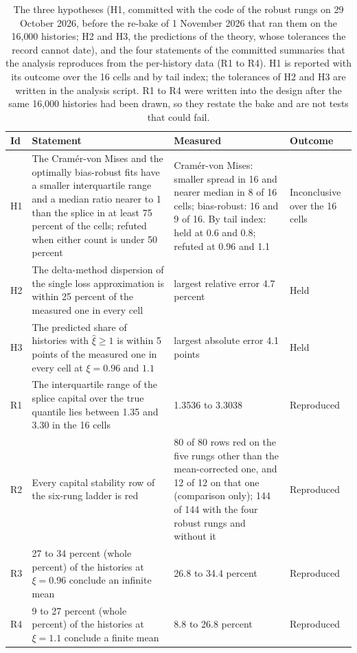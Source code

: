 \begin{table}[htbp]
\centering\small
\caption{The three hypotheses (H1, committed with the code of the robust rungs on 29 October 2026, before the re-bake of 1 November 2026 that ran them on the 16{,}000 histories; H2 and H3, the predictions of the theory, whose tolerances the record cannot date), and the four statements of the committed summaries that the analysis reproduces from the per-history data (R1 to R4). H1 is reported with its outcome over the 16 cells and by tail index; the tolerances of H2 and H3 are written in the analysis script. R1 to R4 were written into the design after the same 16{,}000 histories had been drawn, so they restate the bake and are not tests that could fail.}
\label{tab:hypotheses}
\begin{tabularx}{\textwidth}{lXXl}
\toprule
Id & Statement & Measured & Outcome \\
\midrule
H1 & The Cram\'er-von Mises and the optimally bias-robust fits have a smaller interquartile range and a median ratio nearer to 1 than the splice in at least 75 percent of the cells; refuted when either count is under 50 percent & Cram\'er-von Mises: smaller spread in 16 and nearer median in 8 of 16 cells; bias-robust: 16 and 9 of 16. By tail index: held at 0.6 and 0.8; refuted at 0.96 and 1.1 & Inconclusive over the 16 cells \\
H2 & The delta-method dispersion of the single loss approximation is within 25 percent of the measured one in every cell & largest relative error 4.7 percent & Held \\
H3 & The predicted share of histories with $\hat\xi\ge1$ is within 5 points of the measured one in every cell at $\xi=0.96$ and $1.1$ & largest absolute error 4.1 points & Held \\
\midrule
R1 & The interquartile range of the splice capital over the true quantile lies between 1.35 and 3.30 in the 16 cells & 1.3536 to 3.3038 & Reproduced \\
R2 & Every capital stability row of the six-rung ladder is red & 80 of 80 rows red on the five rungs other than the mean-corrected one, and 12 of 12 on that one (comparison only); 144 of 144 with the four robust rungs and without it & Reproduced \\
R3 & 27 to 34 percent (whole percent) of the histories at $\xi=0.96$ conclude an infinite mean & 26.8 to 34.4 percent & Reproduced \\
R4 & 9 to 27 percent (whole percent) of the histories at $\xi=1.1$ conclude a finite mean & 8.8 to 26.8 percent & Reproduced \\
\bottomrule
\end{tabularx}
\end{table}
